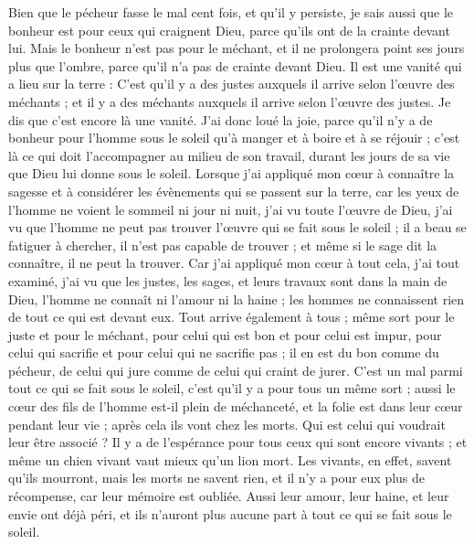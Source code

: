 \begin{multicols}{2}
Bien que le pécheur fasse le mal cent fois, et qu’il y persiste, je sais aussi que le bonheur est pour ceux qui craignent Dieu, parce qu’ils ont de la crainte devant lui.
Mais le bonheur n’est pas pour le méchant, et il ne prolongera point ses jours plus que l'ombre, parce qu'il n’a pas de crainte devant Dieu.
Il est une vanité qui a lieu sur la terre : C'est qu'il y a des justes auxquels il arrive selon l'œuvre des méchants ; et il y a des méchants auxquels il arrive selon l'œuvre des justes. Je dis que c’est encore là une vanité.
J'ai donc loué la joie, parce qu'il n'y a de bonheur pour l’homme sous le soleil qu’à manger et à boire et à se réjouir ; c'est là ce qui doit l’accompagner au milieu de son travail, durant les jours de sa vie que Dieu lui donne sous le soleil.
Lorsque j’ai appliqué mon cœur à connaître la sagesse et à considérer les évènements qui se passent sur la terre, car les yeux de l’homme ne voient le sommeil ni jour ni nuit,
j’ai vu toute l'œuvre de Dieu, j’ai vu que l'homme ne peut pas trouver l'œuvre qui se fait sous le soleil ; il a beau se fatiguer à chercher, il n’est pas capable de trouver ; et même si le sage dit la connaître, il ne peut la trouver.
\VerseOne{}Car j'ai appliqué mon cœur à tout cela, j’ai tout examiné, j’ai vu que les justes, les sages, et leurs travaux sont dans la main de Dieu, l’homme ne connaît ni l’amour ni la haine ; les hommes ne connaissent rien de tout ce qui est devant eux.
Tout arrive également à tous ; même sort pour le juste et pour le méchant, pour celui qui est bon et pour celui est impur, pour celui qui sacrifie et pour celui qui ne sacrifie pas ; il en est du bon comme du pécheur, de celui qui jure comme de celui qui craint de jurer.
C'est un mal parmi tout ce qui se fait sous le soleil, c’est qu’il y a pour tous un même sort ; aussi le cœur des fils de l’homme est-il plein de méchanceté, et la folie est dans leur cœur pendant leur vie ; après cela ils vont chez les morts. Qui est celui qui voudrait leur être associé ?
Il y a de l'espérance pour tous ceux qui sont encore vivants ; et même un chien vivant vaut mieux qu'un lion mort.
Les vivants, en effet, savent qu'ils mourront, mais les morts ne savent rien, et il n’y a pour eux plus de récompense, car leur mémoire est oubliée.
Aussi leur amour, leur haine, et leur envie ont déjà péri, et ils n'auront plus aucune part à tout ce qui se fait sous le soleil.

\end{multicols}
